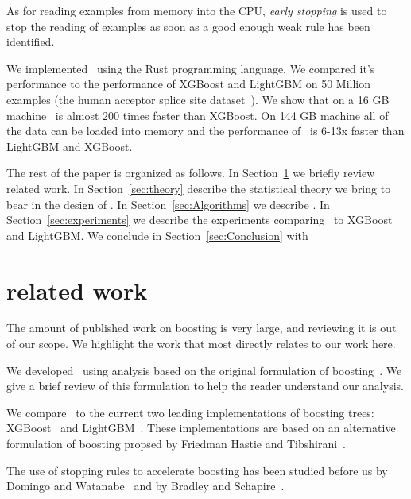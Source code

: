 As for reading examples from memory into the CPU, {\em early stopping}
is used to stop the reading of examples as soon as a good enough weak
rule has been identified.

We implemented \Sparrow\ using the Rust programming language. We
compared it's performance to the performance of XGBoost and LightGBM on
50 Million examples (the human acceptor splice site
dataset~\cite{sonnenburg_coffin_2010, agarwal_reliable_2014}). We
show that on a 16 GB machine \Sparrow\ is almost 200 times faster than
XGBoost. On 144 GB machine all of the data can be loaded into memory
and the performance of \Sparrow\ is 6-13x faster than LightGBM and XGBoost.

The rest of the paper is organized as follows. In
Section~\ref{sec:relatedWork} we briefly review related work.  In
Section~\ref{sec:theory} describe the statistical theory we bring to
bear in the design of \Sparrow. In Section~\ref{sec:Algorithms} we describe
\Sparrow. In Section~\ref{sec:experiments} we describe the experiments
comparing \Sparrow\ to XGBoost and LightGBM. We conclude in
Section~\ref{sec:Conclusion} with %

\section{related work} \label{sec:relatedWork}

The amount of published work on boosting is very large, and reviewing
it is out of our scope. We highlight the work that most directly
relates to our work here.

We developed \Sparrow\ using analysis based on the original formulation of
boosting~\cite{freund_alternating_1999, schapire_improved_1999, freund_alternating_1999, schapire_boosting:_2012}. We give a brief
review of this formulation to help the reader understand our analysis.

We compare \Sparrow\ to the current two leading implementations
of boosting trees: XGBoost~\cite{chen_xgboost:_2016} and
LightGBM~\cite{ke_lightgbm:_2017}.
These implementations are based on an alternative formulation of
boosting propsed by Friedman Hastie and
Tibshirani~\cite{friedman_additive_2000}.

The use of stopping rules to accelerate boosting has been studied 
before us by Domingo and Watanabe~\cite{domingo_scaling_2000} and by
Bradley and Schapire~\cite{bradley_filterboost:_2007}.

